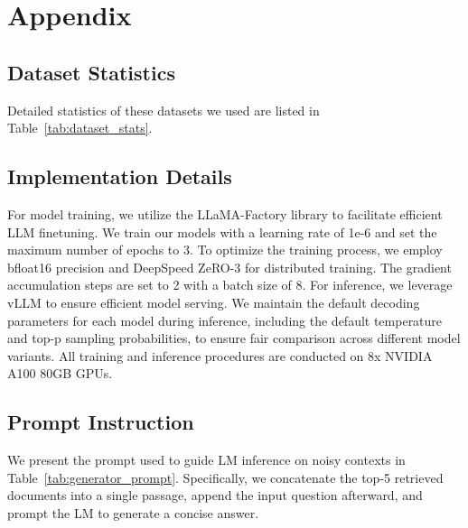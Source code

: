 



\section{Appendix}
\subsection{Dataset Statistics}
\label{sec:dataset_stats}
Detailed statistics of these datasets we used are listed in Table~\ref{tab:dataset_stats}.

\subsection{Implementation Details}
For model training, we utilize the LLaMA-Factory library to facilitate efficient LLM finetuning. We train our models with a learning rate of 1e-6 and set the maximum number of epochs to 3. To optimize the training process, we employ bfloat16 precision and DeepSpeed ZeRO-3 for distributed training. The gradient accumulation steps are set to 2 with a batch size of 8. For inference, we leverage vLLM to ensure efficient model serving. We maintain the default decoding parameters for each model during inference, including the default temperature and top-p sampling probabilities, to ensure fair comparison across different model variants. All training and inference procedures are conducted on 8x NVIDIA A100 80GB GPUs.

\subsection{Prompt Instruction}
\label{sec:prompt}
We present the prompt used to guide LM inference on noisy contexts in Table~\ref{tab:generator_prompt}. Specifically, we concatenate the top-5 retrieved documents into a single passage, append the input question afterward, and prompt the LM to generate a concise answer. 











